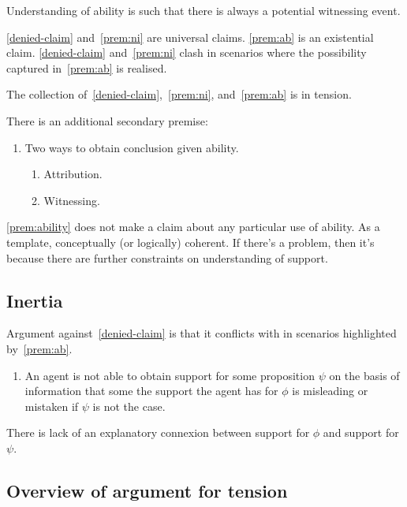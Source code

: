 \documentclass[10pt]{article}
\begin{document}
Understanding of ability is such that there is always a potential witnessing event.

\ref{denied-claim} and~\ref{prem:ni} are universal claims.
\ref{prem:ab} is an existential claim.
\ref{denied-claim} and~\ref{prem:ni} clash in scenarios where the possibility captured in~\ref{prem:ab} is realised.

The collection of~\ref{denied-claim},~\ref{prem:ni}, and~\ref{prem:ab} is in tension.

There is an additional secondary premise:

\begin{note}
\begin{enumerate}
\item\label{prem:ability} Two ways to obtain conclusion given ability.
  \begin{enumerate}
  \item Attribution.
  \item Witnessing.
  \end{enumerate}
\end{enumerate}

\ref{prem:ability} does not make a claim about any particular use of ability.
As a template, conceptually (or logically) coherent.
If there's a problem, then it's because there are further constraints on understanding of support.
\end{note}


\subsection{Inertia}
\label{sec:inertia}

Argument against~\ref{denied-claim} is that it conflicts with \nI{-} in scenarios highlighted by~\ref{prem:ab}.

\begin{enumerate}[label=\nI{}, ref=\nI{}]
\item\label{prem:ni} An agent is not able to obtain support for some proposition \(\psi\) on the basis of information that some the support the agent has for \(\phi\) is misleading or mistaken if \(\psi\) is not the case.
\end{enumerate}

There is lack of an explanatory connexion between support for \(\phi\) and support for \(\psi\).



\subsection{Overview of argument for tension}
\label{sec:overv-argum-tens}
\end{document}
